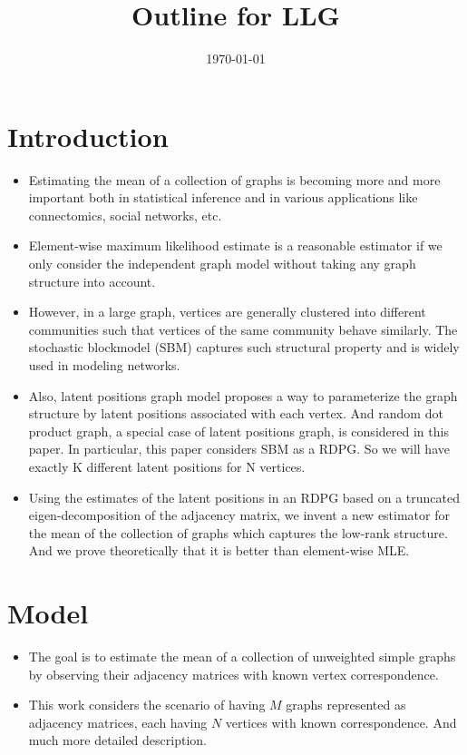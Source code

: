 \documentclass[a4paper]{article}
\title{Outline for LLG}
\date{\today}
\begin{document}
\maketitle

\section{Introduction}

\begin{itemize}
\item Estimating the mean of a collection of graphs is becoming more and more important both in statistical inference and in various applications like connectomics, social networks, etc.
\item Element-wise maximum likelihood estimate is a reasonable estimator if we only consider the independent graph model without taking any graph structure into account.
\item However, in a large graph, vertices are generally clustered into different communities such that vertices of the same community behave similarly. The stochastic blockmodel (SBM) captures such structural property and is widely used in modeling networks.
\item Also, latent positions graph model proposes a way to parameterize the graph structure by latent positions associated with each vertex. And random dot product graph, a special case of latent positions graph, is considered in this paper. In particular, this paper considers SBM as a RDPG. So we will have exactly K different latent positions for N vertices.
\item Using the estimates of the latent positions in an RDPG based on a truncated eigen-decomposition of the adjacency matrix, we invent a new estimator for the mean of the collection of graphs which captures the low-rank structure. And we prove theoretically that it is better than element-wise MLE.
\end{itemize}


\section{Model}

\begin{itemize}
\item The goal is to estimate the mean of a collection of unweighted simple graphs by observing their adjacency matrices with known vertex correspondence.
\item This work considers the scenario of having $M$ graphs represented as adjacency matrices, each having $N$ vertices with known correspondence. And much more detailed description.
\end{itemize}
\end{document}
